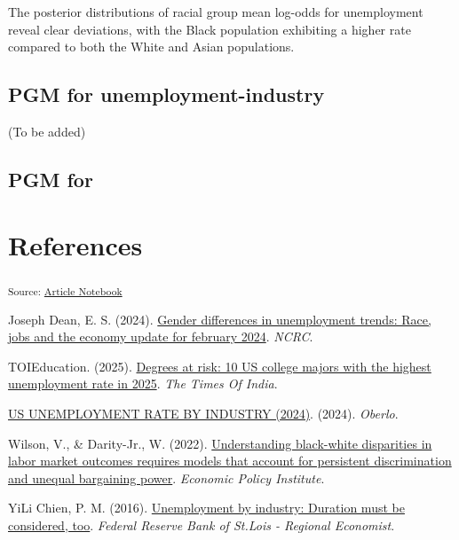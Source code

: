 \documentclass[
]{agujournal2019}
\newlength{\cslhangindent}
\newenvironment{CSLReferences}[2] %
 {\begin{list}{}{%
  \setlength{\itemindent}{0pt}
  \setlength{\leftmargin}{0pt}
  \setlength{\parsep}{0pt}
  \ifodd #1
   \setlength{\leftmargin}{\cslhangindent}
   \setlength{\itemindent}{-1\cslhangindent}
  \fi
  \setlength{\itemsep}{#2\baselineskip}}}
 {\end{list}}
\begin{document}
The posterior distributions of racial group mean log-odds for
unemployment reveal clear deviations, with the Black population
exhibiting a higher rate compared to both the White and Asian
populations.

\subsection{PGM for
unemployment-industry}\label{pgm-for-unemployment-industry}

(To be added)

\subsection{PGM for}\label{pgm-for}

\section*{References}\label{references}

\vspace{1em}

\textsubscript{Source:
\href{https://mw1296.github.io/dsan5650_social_causal_inference/index.qmd.html}{Article
Notebook}}

\label{refs}
\begin{CSLReferences}{1}{0}
Joseph Dean, E. S. (2024). \href{}{Gender differences in unemployment
trends: Race, jobs and the economy update for february 2024}.
\emph{NCRC}.

TOIEducation. (2025). \href{}{Degrees at risk: 10 US college majors with
the highest unemployment rate in 2025}. \emph{The Times Of India}.

\href{}{US UNEMPLOYMENT RATE BY INDUSTRY (2024)}. (2024). \emph{Oberlo}.

Wilson, V., \& Darity-Jr., W. (2022). \href{}{Understanding black-white
disparities in labor market outcomes requires models that account for
persistent discrimination and unequal bargaining power}. \emph{Economic
Policy Institute}.

YiLi Chien, P. M. (2016). \href{}{Unemployment by industry: Duration
must be considered, too}. \emph{Federal Reserve Bank of St.Lois -
Regional Economist}.

\end{CSLReferences}
\end{document}
